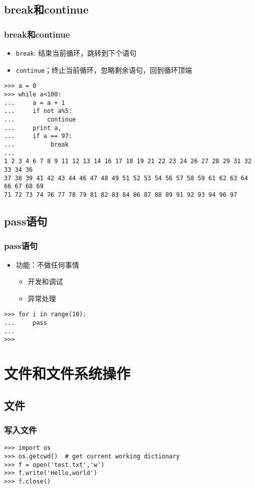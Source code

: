 \documentclass[13pt]{beamer}
\begin{document}
\subsection{break和continue}
\begin{frame}
\frametitle{break和continue}
\begin{itemize}
\item \lstinline{break}: 结束当前循环，跳转到下个语句
\item \lstinline{continue}；终止当前循环，忽略剩余语句，回到循环顶端
\end{itemize}
\begin{lstlisting}
>>> a = 0
>>> while a<100:
...     a = a + 1
...     if not a%5:
...         continue
...     print a,
...     if a == 97:
...          break
...
1 2 3 4 6 7 8 9 11 12 13 14 16 17 18 19 21 22 23 24 26 27 28 29 31 32 33 34 36
37 38 39 41 42 43 44 46 47 48 49 51 52 53 54 56 57 58 59 61 62 63 64 66 67 68 69 
71 72 73 74 76 77 78 79 81 82 83 84 86 87 88 89 91 92 93 94 96 97
\end{lstlisting}
\end{frame}

\subsection{pass语句}
\begin{frame}[containsverbatim]
\frametitle{pass语句}
\begin{itemize}
\item 功能：不做任何事情
\begin{itemize}
\item 开发和调试
\item 异常处理
\end{itemize}
\end{itemize}
\begin{lstlisting}
>>> for i in range(10):
...     pass
...
>>>
\end{lstlisting}
\end{frame}

\section{文件和文件系统操作}

\subsection{文件}
\begin{frame}[containsverbatim]
\frametitle{写入文件}
\begin{lstlisting}
>>> import os
>>> os.getcwd()  # get current working dictionary
>>> f = open('test.txt','w')
>>> f.write('Hello,world')
>>> f.close()
\end{lstlisting}
\end{frame}
\end{document}
